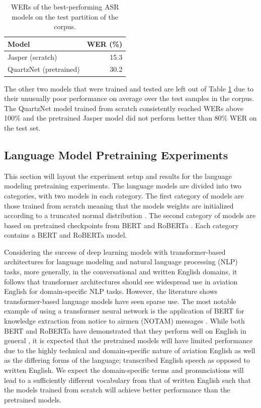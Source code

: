 \documentclass[12pt]{article}
\begin{document}
\begin{table}[!t]
    \centering
    \begin{tabular}{l r}
        \toprule
        Model                  & WER (\%) \\
        \midrule
        Jasper (scratch)       & 15.3     \\
        QuartzNet (pretrained) & 30.2     \\
        \bottomrule
    \end{tabular}
    \caption{WERs of the best-performing ASR models on the test partition of the corpus.}
    \label{tab:asr_performance}
\end{table}

The other two models that were trained and tested are left out of Table \ref{tab:asr_performance} due to their unusually poor performance on average
over the test samples in the corpus. The QuartzNet model trained from scratch consistently reached WERs above 100\% and the pretrained Jasper model
did not perform better than 80\% WER on the test set.

\subsection{Language Model Pretraining Experiments}\label{sec:lm_pretraining}
This section will layout the experiment setup and results for the language modeling pretraining experiments. The language models are divided into two
categories, with two models in each category. The first category of models are those trained from scratch meaning that the models weights are
initialized according to a truncated normal distribution \cite{burkardt_truncated_2014}. The second category of models are based on pretrained
checkpoints from BERT and RoBERTa \cite{devlin_bert_2019,liu_roberta_2019}. Each category contains a BERT and RoBERTa model.

Considering the success of deep learning models with transformer-based architectures for language modeling and natural language processing (NLP)
tasks, more generally, in the conversational and written English domains, it follows that transformer architectures should see widespread use in
aviation English for domain-specific NLP tasks. However, the literature shows transformer-based language models have seen sparse use. The most notable
example of using a transformer neural network is the application of BERT for knowledge extraction from notice to airmen (NOTAM) messages
\cite{arnold_knowledge_2022}. While both BERT and RoBERTa have demonstrated that they perform well on English in general
\cite{devlin_bert_2019,liu_roberta_2019}, it is expected that the pretrained models will have limited performance due to the highly technical and
domain-specific nature of aviation English as well as the differing forms of the language; transcribed English speech as opposed to written English.
We expect the domain-specific terms and pronunciations will lead to a sufficiently different vocabulary from that of written English such that the
models trained from scratch will achieve better performance than the pretrained models.
\end{document}
